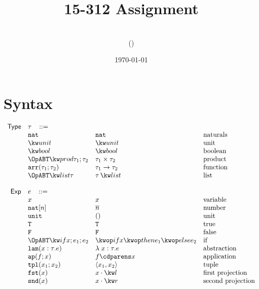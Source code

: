 \documentclass[11pt]{article}
\title{15-312 Assignment \hwnumber}
\author{\myname\\(\myandrewid)}
\date{\today}
\newcommand{\ms}[1]{\ensuremath{\mathsf{#1}}}
\newcommand{\irl}[1]{\mathtt{#1}}
\begin{document}
\maketitle

\section{Syntax}

\[
\begin{array}{r l l l l}
\ms{Type} & \tau \,\,\,\,\, ::= \\
	& \irl{nat}                	 			& \irl{nat}											& \text{naturals}\\
	& \unittyabt                	 			& \unittycst										& \text{unit}\\
  & \booltyabt                       & \booltycst                    & \text{boolean}\\
  & \prodtyabt{\tau_1}{\tau_2}       & \prodtycst{\tau_1}{\tau_2}    & \text{product}\\
	&\irl{arr}(\tau_1;\tau_2) 				& \arrtycst{\tau_1}{\tau_2} 									& \text{function}\\
  &\listtyabt{\tau}		& \listtycst{\tau}											& \text{list}\\
	 \\
\ms{Exp}
        & e   \,\,\,\,\, ::= \\
 	& x                                			& x 												& \text{variable}\\
  & \irl{nat}[n]							& \numeral{n}												& \text{number}\\
  & \irl{unit}							& ()												& \text{unit}\\
  & \irl{T}							& \irl{T}												& \text{true}\\
  & \irl{F}	   					& \irl{F}												& \text{false}\\
  & \ifexabt{x}{e_1}{e_2} & \ifexcst{x}{e_1}{e_2}  & \text{if}\\
  & \irl{lam}(x:\tau.e) 						&\lambda \; x : \tau. e 		& \text{abstraction}\\
  & \irl{ap}(f;x) 					& \appcst{f}{x} 										& \text{application}\\
  & \irl{tpl}(x_1;x_2)     	& \pairexcst{x_1}{x_2}                									& \text{tuple}\\
 	& \irl{fst}(x)					& \fstexcst{x}   										& \text{first projection}\\
 	& \irl{snd}(x)					& \sndexcst{x}   										& \text{second projection}\\

\end{array}\]
\end{document}
